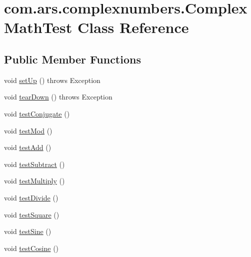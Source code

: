 \hypertarget{classcom_1_1ars_1_1complexnumbers_1_1_complex_math_test}{}\section{com.\+ars.\+complexnumbers.\+Complex\+Math\+Test Class Reference}
\label{classcom_1_1ars_1_1complexnumbers_1_1_complex_math_test}
\subsection*{Public Member Functions}
\begin{DoxyCompactItemize}
\item 
void \hyperlink{classcom_1_1ars_1_1complexnumbers_1_1_complex_math_test_a038ac671e0502ed2448f4649da993131}{set\+Up} ()  throws Exception 
\item 
void \hyperlink{classcom_1_1ars_1_1complexnumbers_1_1_complex_math_test_aa0a4283d8c92cfd428208a61fb0b2753}{tear\+Down} ()  throws Exception 
\item 
void \hyperlink{classcom_1_1ars_1_1complexnumbers_1_1_complex_math_test_a29817014ba09b1d2f985882ddfcbfae2}{test\+Conjugate} ()
\item 
void \hyperlink{classcom_1_1ars_1_1complexnumbers_1_1_complex_math_test_af1b3b844bab2323d1bd4bb07712f7652}{test\+Mod} ()
\item 
void \hyperlink{classcom_1_1ars_1_1complexnumbers_1_1_complex_math_test_a820df886e3c20f3cbe36ff6905e1d67e}{test\+Add} ()
\item 
void \hyperlink{classcom_1_1ars_1_1complexnumbers_1_1_complex_math_test_a79e2b206d48588b1e7db17a681a405eb}{test\+Subtract} ()
\item 
void \hyperlink{classcom_1_1ars_1_1complexnumbers_1_1_complex_math_test_a195e4c9c2b94ada809ff5ca462a9dc06}{test\+Multiply} ()
\item 
void \hyperlink{classcom_1_1ars_1_1complexnumbers_1_1_complex_math_test_a8ddaa1e32717e2b18f6c64010c688b6d}{test\+Divide} ()
\item 
void \hyperlink{classcom_1_1ars_1_1complexnumbers_1_1_complex_math_test_a43dc686fe2b96e097f3ee8095fef12c1}{test\+Square} ()
\item 
void \hyperlink{classcom_1_1ars_1_1complexnumbers_1_1_complex_math_test_ab429903cc819ea2c83369e07ba2f49e9}{test\+Sine} ()
\item 
void \hyperlink{classcom_1_1ars_1_1complexnumbers_1_1_complex_math_test_a453b6e66b0570b74892caa9ec83c47cb}{test\+Cosine} ()

\end{DoxyCompactItemize}
